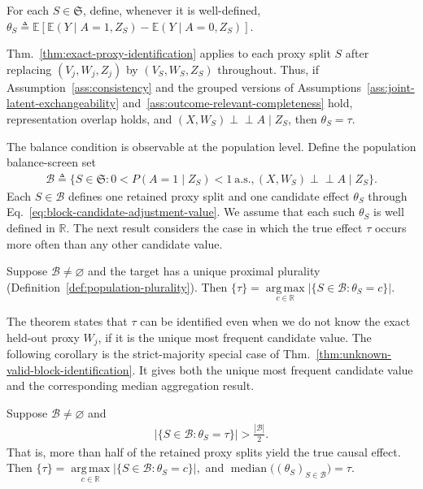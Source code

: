 For each $S\in\mathfrak S$, define, whenever it is well-defined,
\(\theta_S \triangleq \mathbb E\!\left[ \mathbb E(Y\mid A=1,Z_S) - \mathbb E(Y\mid A=0,Z_S) \right].\)

Thm.~\ref{thm:exact-proxy-identification} applies to each proxy split $S$ after replacing $(V_j,W_j,Z_j)$ by $(V_S,W_S,Z_S)$ throughout. Thus, if Assumption~\ref{ass:consistency} and the grouped versions of Assumptions~\ref{ass:joint-latent-exchangeability} and~\ref{ass:outcome-relevant-completeness} hold, representation overlap holds, and $(X,W_S)\perp\!\!\!\perp A\mid Z_S$, then $\theta_S=\tau$.

The balance condition is observable at the population level. Define the population balance-screen set
\begin{align}
	\mathcal B
	\triangleq
	\bigl\{S\in\mathfrak S:
	0<P(A=1\mid Z_S)<1\ \text{a.s.},
	(X,W_S)\perp\!\!\!\perp A\mid Z_S
	\bigr\}.
	\label{eq:population-balance-screen}
\end{align}
Each $S\in\mathcal B$ defines one retained proxy split and one candidate effect $\theta_S$ through Eq.~\eqref{eq:block-candidate-adjustment-value}. We assume that each such $\theta_S$ is well defined in $\mathbb R$. The next result considers the case in which the true effect $\tau$ occurs more often than any other candidate value.

\begin{theorem}
\label{appdetail:thm:unknown-valid-block-identification}
	\normalfont
	Suppose $\mathcal B\neq\varnothing$ and
	the target has a unique proximal plurality (Definition~\ref{def:population-plurality}). Then
	\(\{\tau\} = \underset{c\in\mathbb R}{\operatorname{arg\,max}} \bigl|\{S\in\mathcal B:\theta_S=c\}\bigr|.\)
\end{theorem}
The theorem states that $\tau$ can be identified even when we do not know the exact held-out proxy $W_j$, if it is the unique most frequent candidate value. The following corollary is the strict-majority special case of Thm.~\ref{thm:unknown-valid-block-identification}. It gives both the unique most frequent candidate value and the corresponding median aggregation result.

\begin{corollary}
	\label{cor:target-majority-median}
	\normalfont
	Suppose $\mathcal B\neq\varnothing$ and
	\begin{align}
		\bigl|\{S\in\mathcal B:\theta_S=\tau\}\bigr|>\frac{|\mathcal B|}{2}.
		\label{eq:target-valued-majority}
	\end{align}
	That is, more than half of the retained proxy splits yield the true causal effect. Then
	\(\{\tau\} = \underset{c\in\mathbb R}{\operatorname{arg\,max}} \bigl|\{S\in\mathcal B:\theta_S=c\}\bigr|,\)
	and
	\(\operatorname{median}\bigl((\theta_S)_{S\in\mathcal B}\bigr)=\tau.\)
\end{corollary}

